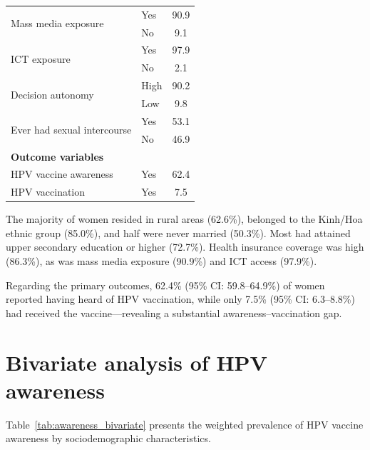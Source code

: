 \begin{table}[htbp]
\begin{tabular}{|p{4.5cm}|p{4.0cm}|c|}
\hline
\multirow{2}{*}{Mass media exposure} & Yes & 90.9 \\
 & No & 9.1 \\
\hline
\multirow{2}{*}{ICT exposure} & Yes & 97.9 \\
 & No & 2.1 \\
\hline
\multirow{2}{*}{Decision autonomy} & High & 90.2 \\
 & Low & 9.8 \\
\hline
\multirow{2}{*}{Ever had sexual intercourse} & Yes & 53.1 \\
 & No & 46.9 \\
\hline
\hline
\multicolumn{3}{|l|}{\textbf{Outcome variables}} \\
\hline
HPV vaccine awareness & Yes & 62.4 \\
HPV vaccination & Yes & 7.5 \\
\hline
\end{tabular}
\label{tab:descriptive}
\end{table}

The majority of women resided in rural areas (62.6\%), belonged to the Kinh/Hoa ethnic group (85.0\%), and half were never married (50.3\%). Most had attained upper secondary education or higher (72.7\%). Health insurance coverage was high (86.3\%), as was mass media exposure (90.9\%) and ICT access (97.9\%).

Regarding the primary outcomes, 62.4\% (95\% CI: 59.8--64.9\%) of women reported having heard of HPV vaccination, while only 7.5\% (95\% CI: 6.3--8.8\%) had received the vaccine---revealing a substantial awareness--vaccination gap.

\section{Bivariate analysis of HPV awareness}

Table~\ref{tab:awareness_bivariate} presents the weighted prevalence of HPV vaccine awareness by sociodemographic characteristics.

